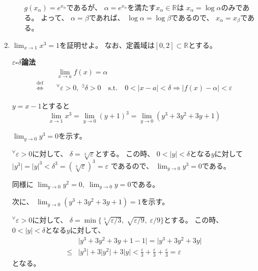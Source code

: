 \documentclass[12pt,b5paper]{ltjsarticle}
\begin{document}
\begin{enumerate}
\begin{enumerate}
             $g(x_{\alpha})=e^{x_{\alpha}}$であるが、
             $\alpha = e^{x_{\alpha}}$を満たす$x_{\alpha}\in \mathbb{R}$は
             $x_{\alpha} = \log{\alpha}$のみである。
             よって、
             $\alpha = \beta$であれば、
             $\log{\alpha} = \log{\beta}$であるので、
             $x_{\alpha}=x_{\beta}$である。

      \end{enumerate}

      \hrulefill
 \item
      $\displaystyle \lim_{x\to 1}x^{3} = 1$を証明せよ。
      なお、定義域は$[0,2] \subset \mathbb{R}$とする。

      \dotfill

      \textbf{$\varepsilon$-$\delta$論法}
      \begin{align}
       & \lim_{x\to a} f(x) = \alpha \\
       \overset{\textrm{def}}{\Longleftrightarrow} \quad
       & {}^{\forall} \varepsilon >0, \; {}^{\exists}\delta>0
        \quad \mathrm{s.t.} \quad
        0< \lvert x-a \rvert < \delta \Rightarrow \lvert f(x)-\alpha \rvert < \varepsilon
      \end{align}

      \dotfill

      $y=x-1$とすると
      \begin{equation}
       \lim_{x\to 1}x^{3}
        = \lim_{y\to 0}(y+1)^{3}
        = \lim_{y\to 0}(y^{3} + 3y^{2} + 3y +1)
      \end{equation}

      $\displaystyle \lim_{y\to 0}y^{3} = 0$を示す。

      ${}^{\forall}\varepsilon>0$に対して、
      $\delta = \sqrt[3]{\varepsilon}$とする。
      この時、
      $0 < \lvert y \rvert < \delta$となる$y$に対して
      $\lvert y^{3} \rvert = \lvert y \rvert^{3} < \delta^{3} = (\sqrt[3]{\varepsilon})^{3} = \varepsilon$
      であるので、
      $\displaystyle \lim_{y\to 0}y^{3} = 0$である。

      同様に
      $\displaystyle \lim_{y\to 0}y^{2} = 0,\; \lim_{y\to 0}y = 0$である。

      次に、
      $\displaystyle \lim_{y\to 0}(y^{3}+3y^{2}+3y+1) = 1$を示す。

      ${}^{\forall}\varepsilon>0$に対して、
      $\delta=\min\{\sqrt[3]{\varepsilon/3}, \; \sqrt{\varepsilon/9}, \; \varepsilon/9 \}$とする。
      この時、
      $0 < \lvert y \rvert < \delta$となる$y$に対して、
      \begin{align}
       & \lvert y^{3}+3y^{2}+3y+1 -1 \rvert
       = \lvert y^{3}+3y^{2}+3y \rvert\\
       \leq & \lvert y^{3} \rvert + 3 \lvert y^{2} \rvert + 3\lvert y \rvert
       < \frac{\varepsilon}{3} + \frac{\varepsilon}{3} + \frac{\varepsilon}{3}
       =\varepsilon
      \end{align}
      となる。


\end{enumerate}
\end{document}
